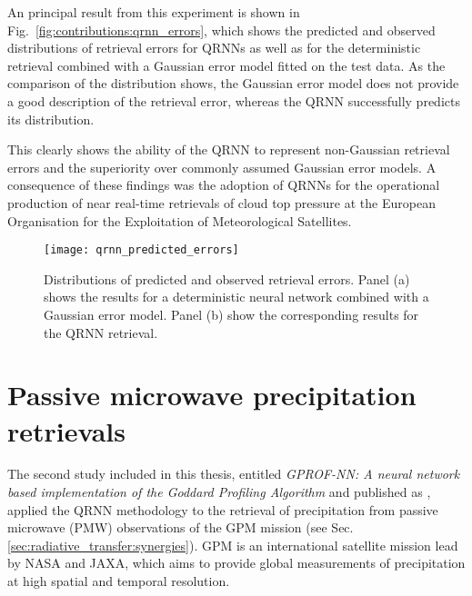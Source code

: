 An principal result from this experiment is shown in
Fig.~\ref{fig:contributions:qrnn_errors}, which shows the predicted and observed
distributions of retrieval errors for QRNNs as well as for the deterministic
retrieval combined with a Gaussian error model fitted on the test data. As
the comparison of the distribution shows, the Gaussian error model does not
provide a good description of the retrieval error, whereas the QRNN
successfully predicts its distribution.

This clearly shows the ability of the QRNN to represent
non-Gaussian retrieval errors and the superiority over commonly assumed Gaussian
error models. A consequence of these findings was the adoption of QRNNs for the
operational production of near real-time retrievals of cloud top pressure at the
European Organisation for the Exploitation of Meteorological Satellites.

\begin{figure}
  \centering
  \texttt{[image: qrnn\_predicted\_errors]}
  \caption{Distributions of predicted and observed retrieval errors.
    Panel (a) shows the results for a deterministic neural network
    combined with a Gaussian error model. Panel (b) show the corresponding
    results for the QRNN retrieval.}
  \label{fig:machine_learning:qrnn_errors}
\end{figure}

\section{Passive microwave precipitation retrievals}

The second study included in this thesis, entitled \textit{ GPROF-NN: A neural
  network based implementation of the Goddard Profiling Algorithm} and published
as \citet{pfreundschuh22a}, applied the QRNN methodology to the retrieval of
precipitation from passive microwave (PMW) observations of the GPM mission (see
Sec.\ref{sec:radiative_transfer:synergies}). GPM is an international satellite
mission lead by NASA and JAXA, which aims to provide global measurements of
precipitation at high spatial and temporal resolution.


